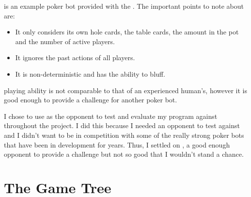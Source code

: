  


\sbt is an example poker bot provided with the \meer. The important points to note about \sbt are:
\begin{itemize}
\item It only considers its own hole cards, the table cards, the amount in the pot and the number of active players.
\item It ignores the past actions of all players.
\item It is non-deterministic and has the ability to bluff.
\end{itemize}

\sbts playing ability is not comparable to that of an experienced human's, however it is good enough to provide a challenge for another poker bot. 

I chose to use \sbt as the opponent to test and evaluate my program against throughout the project. I did this because I needed an opponent to test against and I didn't want to be in competition with some of the really strong poker bots that have been in development for years. Thus, I settled on \sbt, a good enough opponent to provide a challenge but not so good that 
I wouldn't stand a chance.




\section{The Game Tree}							%



